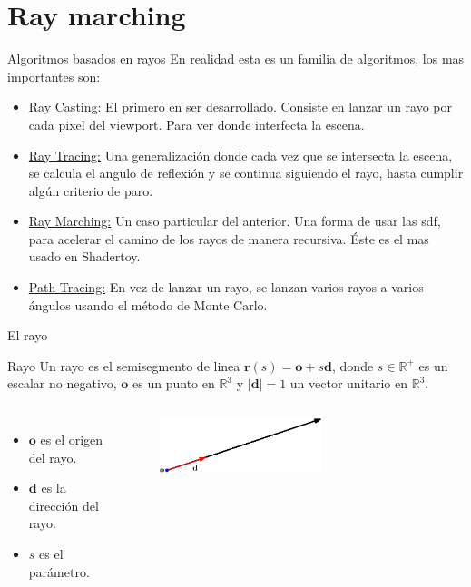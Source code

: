 \section{Ray marching}
\begin{frame}{Algoritmos basados en rayos}
En realidad esta es un familia de algoritmos, los mas importantes son:

\begin{itemize}
    \item \href{https://en.wikipedia.org/wiki/Ray_casting}{Ray Casting:} El primero en ser desarrollado. Consiste en lanzar un rayo por cada pixel del viewport. Para ver donde interfecta la escena.
    \item \href{https://en.wikipedia.org/wiki/Ray_tracing_(graphics)}{Ray Tracing:} Una generalización donde cada vez que se intersecta la escena, se calcula el angulo de reflexión y se continua siguiendo el rayo, hasta cumplir algún criterio de paro.
    \item \href{https://en.wikipedia.org/wiki/Ray_marching}{Ray Marching:} Un caso particular del anterior. Una forma de usar las sdf, para acelerar el camino de los rayos de manera recursiva. Éste es el mas usado en Shadertoy.
    \item \href{https://en.wikipedia.org/wiki/Path_tracing}{Path Tracing:} En vez de lanzar un rayo, se lanzan varios rayos a varios ángulos usando el método de Monte Carlo.
\end{itemize}

\end{frame}

\begin{frame}{El rayo}
\begin{block}{Rayo}
Un rayo es el semisegmento de linea $\mathbf{r}(s) = \mathbf{o} + s  \mathbf{d}$, donde $s \in \mathbb{R}^{+}$ es un escalar no negativo, $\mathbf{o}$ es un punto en $\mathbb{R}^3$ y $|\mathbf{d}| = 1$ un vector unitario en $\mathbb{R}^3$.

\end{block}

\begin{columns}
\begin{itemize}
    \item $\mathbf{o}$ es el origen del rayo.
    \item $\mathbf{d}$ es la dirección del rayo.
    \item $s$ es el parámetro.
\end{itemize}    
\begin{figure}[htp]
    \centering
    \includegraphics[width=0.6\textwidth]{img/ray.eps}    
\end{figure}
\end{columns}
\end{frame}

